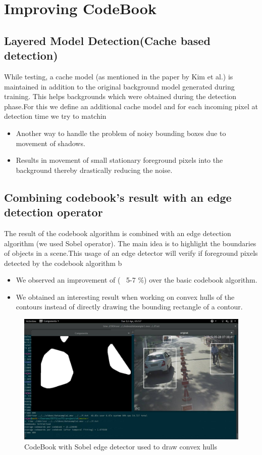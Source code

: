 \documentclass[12pt,a4paper]{article}
\begin{document}
\section{Improving CodeBook}
\subsection{Layered Model Detection(Cache based detection)}
While testing, a cache model (as mentioned in the paper by Kim et al.) is maintained in addition to the original background model generated during training. This helps
backgrounds which were obtained during the detection phase.For this we define an additional cache model and for each incoming pixel at detection time we try to matchin
\begin{itemize}
\item Another way to handle the problem of noisy bounding boxes due to movement of shadows.
\item Results in movement of small stationary foreground pixels into the background thereby drastically reducing the noise.
\end{itemize}

\subsection{Combining codebook's result with an edge detection operator}
The result of the codebook algorithm is combined with an edge detection algorithm (we used Sobel operator).
The main idea is to highlight the boundaries of objects in a scene.This usage of an edge detector will verify if foreground pixels detected by the codebook algorithm b
\begin{itemize}
\item We observed an improvement of (~ 5-7 \%) over the basic codebook algorithm.
\item We obtained an interesting result when working on convex hulls of the contours instead of directly drawing the bounding rectangle of a contour.
\end{itemize}

\begin{figure}[h]
\caption{CodeBook with Sobel edge detector used to draw convex hulls}
\centering
\includegraphics[width=1.0\textwidth]{sobel.png}
\end{figure}
\end{document}
